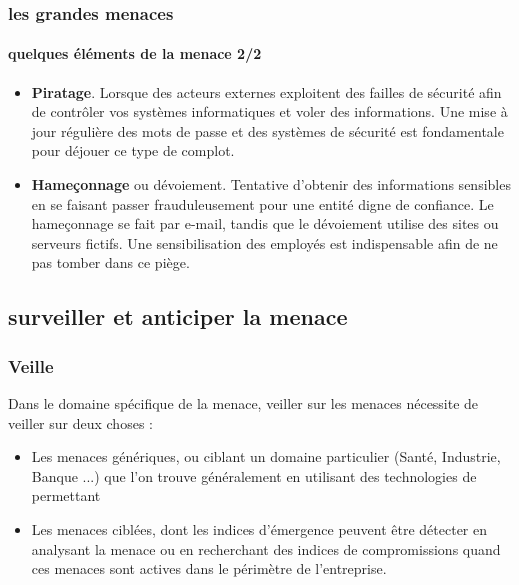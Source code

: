 \begin{frame}
\frametitle<presentation>{les grandes menaces}
\framesubtitle<presentation>{quelques éléments de la menace 2/2}
\begin{itemize}

\item \textbf{Piratage}. Lorsque des acteurs externes exploitent des failles de sécurité afin de contrôler vos systèmes informatiques et voler des informations. Une mise à jour régulière des mots de passe et des systèmes de sécurité est fondamentale pour déjouer ce type de complot.

\item \textbf{Hameçonnage} ou dévoiement. Tentative d’obtenir des informations sensibles en se faisant passer frauduleusement pour une entité digne de confiance. Le hameçonnage se fait par e-mail, tandis que le dévoiement utilise des sites ou serveurs fictifs. Une sensibilisation des employés est indispensable afin de ne pas tomber dans ce piège.
\end{itemize}
\end{frame}




\subsection{surveiller et anticiper la menace}

\begin{frame}
\frametitle<presentation>{Veille}
\end{frame}

Dans le domaine spécifique de la menace, veiller sur les menaces nécessite de veiller sur deux choses : 

\begin{itemize}
  \item Les menaces génériques, ou ciblant un domaine  particulier (Santé, Industrie, Banque ...) que l'on trouve généralement en utilisant des technologies de  permettant 
  \item Les menaces ciblées, dont les indices d'émergence peuvent être détecter en analysant la menace ou  en recherchant des indices de compromissions quand ces menaces sont actives dans le périmètre de l'entreprise. 
\end{itemize}

